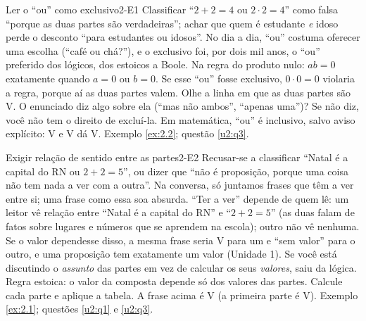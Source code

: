 \ErrosComuns

\begin{erro}{Ler o \enquote{ou} como exclusivo}{2-E1}
 Classificar \enquote{$2+2=4$ ou $2\cdot2=4$} como falsa \enquote{porque as duas partes são verdadeiras}; achar que quem é estudante \emph{e} idoso perde o desconto \enquote{para estudantes ou idosos}.
 No dia a dia, \enquote{ou} costuma oferecer uma escolha (\enquote{café ou chá?}), e o exclusivo foi, por dois mil anos, o \enquote{ou} preferido dos lógicos, dos estoicos a Boole.
 Na regra do produto nulo: $ab=0$ exatamente quando $a=0$ ou $b=0$. Se esse \enquote{ou} fosse exclusivo, $0\cdot0=0$ violaria a regra, porque aí as duas partes valem.
 Olhe a linha em que as duas partes são V. O enunciado diz algo sobre ela (\enquote{mas não ambos}, \enquote{apenas uma})? Se não diz, você não tem o direito de excluí-la.
 Em matemática, \enquote{ou} é inclusivo, salvo aviso explícito: V e V dá V.
 Exemplo \ref{ex:2.2}; questão \ref{u2:q3}.
\end{erro}

\begin{erro}{Exigir relação de sentido entre as partes}{2-E2}
 Recusar-se a classificar \enquote{Natal é a capital do RN ou $2+2=5$}, ou dizer que \enquote{não é proposição, porque uma coisa não tem nada a ver com a outra}.
 Na conversa, só juntamos frases que têm a ver entre si; uma frase como essa soa absurda.
 \enquote{Ter a ver} depende de quem lê: um leitor vê relação entre \enquote{Natal é a capital do RN} e \enquote{$2+2=5$} (as duas falam de fatos sobre lugares e números que se aprendem na escola); outro não vê nenhuma. Se o valor dependesse disso, a mesma frase seria V para um e \enquote{sem valor} para o outro, e uma proposição tem exatamente um valor (Unidade 1).
 Se você está discutindo o \emph{assunto} das partes em vez de calcular os seus \emph{valores}, saiu da lógica.
 Regra estoica: o valor da composta depende só dos valores das partes. Calcule cada parte e aplique a tabela. A frase acima é V (a primeira parte é V).
 Exemplo \ref{ex:2.1}; questões \ref{u2:q1} e \ref{u2:q3}.
\end{erro}

